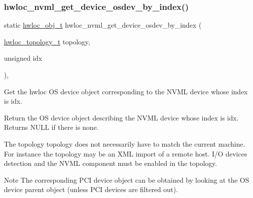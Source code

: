 \subsubsection{\texorpdfstring{hwloc\+\_\+nvml\+\_\+get\+\_\+device\+\_\+osdev\+\_\+by\+\_\+index()}{hwloc\_nvml\_get\_device\_osdev\_by\_index()}}
{\footnotesize\ttfamily static \hyperlink{a00185_ga79b8ab56877ef99ac59b833203391c7d}{hwloc\+\_\+obj\+\_\+t} hwloc\+\_\+nvml\+\_\+get\+\_\+device\+\_\+osdev\+\_\+by\+\_\+index (\begin{DoxyParamCaption}\item[{\hyperlink{a00186_ga9d1e76ee15a7dee158b786c30b6a6e38}{hwloc\+\_\+topology\+\_\+t}}]{topology,  }\item[{unsigned}]{idx }\end{DoxyParamCaption})\hspace{0.3cm}{\ttfamily [inline]}, {\ttfamily [static]}}



Get the hwloc OS device object corresponding to the N\+V\+ML device whose index is {\ttfamily idx}. 

Return the OS device object describing the N\+V\+ML device whose index is {\ttfamily idx}. Returns N\+U\+LL if there is none.

The topology {\ttfamily topology} does not necessarily have to match the current machine. For instance the topology may be an X\+ML import of a remote host. I/O devices detection and the N\+V\+ML component must be enabled in the topology.

\begin{DoxyNote}{Note}
The corresponding P\+CI device object can be obtained by looking at the OS device parent object (unless P\+CI devices are filtered out). 
\end{DoxyNote}
